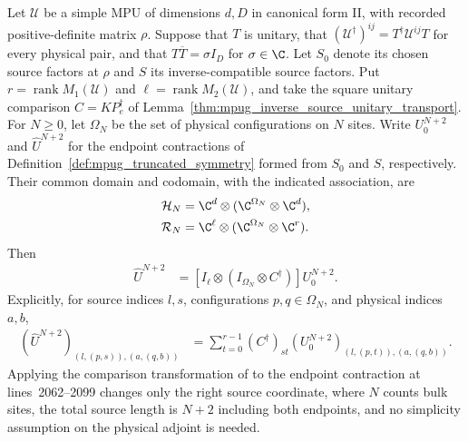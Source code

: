 \begin{lemma}
    \label{thm:mpug_inverse_truncation_transport}
    \leanok
    Let $\mathcal U$ be a simple MPU of dimensions $d,D$ in canonical
    form II, with recorded positive-definite matrix $\rho$. Suppose that
    $T$ is unitary, that $(\mathcal U^\dagger)^{ij}=T^\dagger\mathcal U^{ij}T$
    for every physical pair, and that $T\overline T=\sigma I_D$ for
    $\sigma\in\C$. Let $S_0$ denote its chosen source factors at $\rho$
    and $S$ its inverse-compatible source factors. Put
    $r=\operatorname{rank}M_1(\mathcal U)$ and
    $\ell=\operatorname{rank}M_2(\mathcal U)$, and take the square unitary
    comparison $C=KP_e^\dagger$ of
    Lemma~\ref{thm:mpug_inverse_source_unitary_transport}.
    For $N\geq0$, let $\Omega_N$ be the set of physical configurations
    on $N$ sites. Write $U_0^{N+2}$ and $\widehat U^{N+2}$ for the
    endpoint contractions of Definition~\ref{def:mpug_truncated_symmetry}
    formed from $S_0$ and $S$, respectively. Their common domain and
    codomain, with the indicated association, are
    \begin{align}
        \mathcal H_N & =\C^d\otimes(\C^{\Omega_N}\otimes\C^d),    \\
        \mathcal R_N & =\C^\ell\otimes(\C^{\Omega_N}\otimes\C^r).
    \end{align}
    Then
    \begin{align}
        \widehat U^{N+2}
         & =[I_\ell\otimes(I_{\Omega_N}\otimes C^\dagger)]
        U_0^{N+2}.
    \end{align}
    Explicitly, for source indices $l,s$, configurations $p,q\in\Omega_N$,
    and physical indices $a,b$,
    \begin{align}
        (\widehat U^{N+2})_{(l,(p,s)),(a,(q,b))}
         & =\sum_{t=0}^{r-1}(C^\dagger)_{st}
        (U_0^{N+2})_{(l,(p,t)),(a,(q,b))}.
    \end{align}
    Applying the comparison transformation of
    \cite[lines~5432--5487]{FrancoRubio2025MPUGauging} to the endpoint
    contraction at lines~2062--2099 changes only the right source
    coordinate, where $N$ counts bulk sites, the total source length is
    $N+2$ including both endpoints, and no simplicity assumption on the
    physical adjoint is needed.
\end{lemma}

